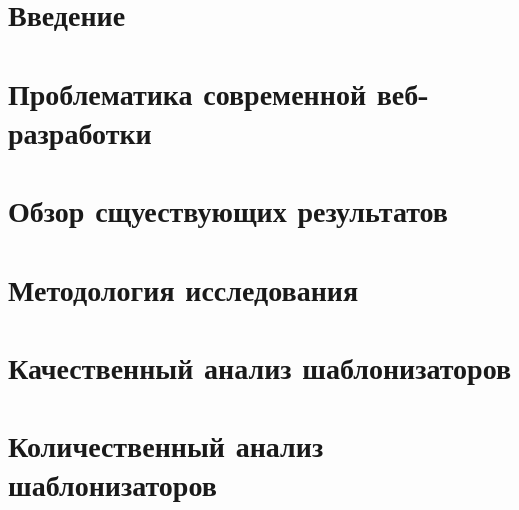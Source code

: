 







\tableofcontents

\section*{Введение}


\newpage
\section{Проблематика современной веб-разработки}


\newpage
\section{Обзор сщуествующих результатов}


\newpage
\section{Методология исследования}


\newpage
\section{Качественный анализ шаблонизаторов}


\newpage
\section{Количественный анализ шаблонизаторов}


